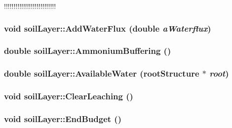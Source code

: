 !!!!!!!!!!!!!!!!!!!!!!!!!!! \hypertarget{classsoil_layer_abe420fbd64b9f2687061a1b7359c2621}{
\subsubsection[{AddWaterFlux}]{\setlength{\rightskip}{0pt plus 5cm}void soilLayer::AddWaterFlux (double {\em aWaterflux})}}
\label{classsoil_layer_abe420fbd64b9f2687061a1b7359c2621}
\hypertarget{classsoil_layer_a31c1fdb870f18880b99105bab46ff88d}{
\subsubsection[{AmmoniumBuffering}]{\setlength{\rightskip}{0pt plus 5cm}double soilLayer::AmmoniumBuffering ()}}
\label{classsoil_layer_a31c1fdb870f18880b99105bab46ff88d}
\hypertarget{classsoil_layer_a7286ebbe37f8e4c31bb32f7d44d461e1}{
\subsubsection[{AvailableWater}]{\setlength{\rightskip}{0pt plus 5cm}double soilLayer::AvailableWater ({\bf rootStructure} $\ast$ {\em root})}}
\label{classsoil_layer_a7286ebbe37f8e4c31bb32f7d44d461e1}
\hypertarget{classsoil_layer_a1d47dbea22d315b19238696a7fb5bbe6}{
\subsubsection[{ClearLeaching}]{\setlength{\rightskip}{0pt plus 5cm}void soilLayer::ClearLeaching ()}}
\label{classsoil_layer_a1d47dbea22d315b19238696a7fb5bbe6}
\hypertarget{classsoil_layer_ac1c46edeecd5a54044c434adf939301b}{
\subsubsection[{EndBudget}]{\setlength{\rightskip}{0pt plus 5cm}void soilLayer::EndBudget ()}}
